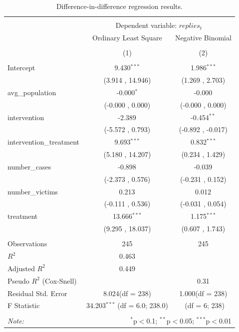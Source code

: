\documentclass[11pt,letterpaper]{article}
\begin{document}
\begin{table}[!htbp] \centering
\begin{tabular*}{\textwidth}{@{\extracolsep{\fill}} l@{\hspace{20pt}} c c}
\\[-1.8ex]\hline
\hline \\[-1.8ex]
& \multicolumn{2}{c}{Dependent variable: $replies_t$} \
\cr \cline{2-3}
\\[-1.8ex] & \multicolumn{1}{c}{Ordinary Least Square} & \multicolumn{1}{c}{Negative Binomial}  \\
\\[-1.8ex] & (1) & (2) \\
\hline \\[-1.8ex]
 Intercept & 9.430$^{***}$ & 1.986$^{***}$ \\
  & (3.914 , 14.946) & (1.269 , 2.703) \\
 avg\_population & -0.000$^{*}$ & -0.000$^{}$ \\
  & (-0.000 , 0.000) & (-0.000 , 0.000) \\
 intervention & -2.389$^{}$ & -0.454$^{**}$ \\
  & (-5.572 , 0.793) & (-0.892 , -0.017) \\
 intervention\_treatment & 9.693$^{***}$ & 0.832$^{***}$ \\
  & (5.180 , 14.207) & (0.234 , 1.429) \\
 number\_cases & -0.898$^{}$ & -0.039$^{}$ \\
  & (-2.373 , 0.576) & (-0.231 , 0.152) \\
 number\_victims & 0.213$^{}$ & 0.012$^{}$ \\
  & (-0.111 , 0.536) & (-0.031 , 0.054) \\
 treatment & 13.666$^{***}$ & 1.175$^{***}$ \\
  & (9.295 , 18.037) & (0.607 , 1.743) \\
\hline \\[-1.8ex]
 Observations & 245 & 245 \\
 $R^2$ & 0.463 &  \\
 Adjusted $R^2$ & 0.449 &  \\
 Pseudo $R^2$ (Cox-Snell) & & 0.31 \\
 Residual Std. Error & 8.024(df = 238) & 1.000(df = 238)  \\
 F Statistic & 34.203$^{***}$ (df = 6.0; 238.0) & $^{}$ (df = 6; 238) \\
\hline
\hline \\[-1.8ex]
\textit{Note:} & \multicolumn{2}{r}{$^{*}$p$<$0.1; $^{**}$p$<$0.05; $^{***}$p$<$0.01} \\
\end{tabular*}
\caption{\label{regression-results}Difference-in-difference regression results.}
\end{table}
\clearpage
\end{document}
